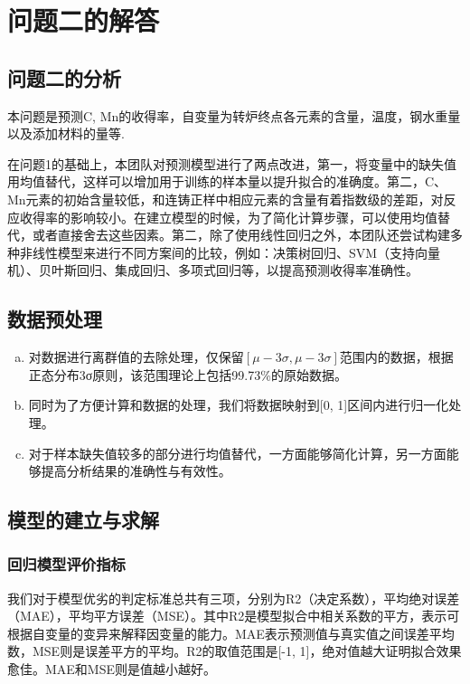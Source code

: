 \documentclass{xcumcmart}
\begin{document}
\section{问题二的解答}
\subsection{问题二的分析}
\par 本问题是预测C, Mn的收得率，自变量为转炉终点各元素的含量，温度，钢水重量以及添加材料的量等.
\par 在问题1的基础上，本团队对预测模型进行了两点改进，第一，将变量中的缺失值用均值替代，这样可以增加用于训练的样本量以提升拟合的准确度。第二，C、Mn元素的初始含量较低，和连铸正样中相应元素的含量有着指数级的差距，对反应收得率的影响较小。在建立模型的时候，为了简化计算步骤，可以使用均值替代，或者直接舍去这些因素。第二，除了使用线性回归之外，本团队还尝试构建多种非线性模型来进行不同方案间的比较，例如：决策树回归、SVM（支持向量机）、贝叶斯回归、集成回归、多项式回归等，以提高预测收得率准确性。



\subsection{数据预处理}
\begin{enumerate}[(a)]
\setlength{\itemindent}{2em}    %
\item 对数据进行离群值的去除处理，仅保留$[\mu-3\sigma,\mu-3\sigma]$范围内的数据，根据正态分布3σ原则，该范围理论上包括99.73\%的原始数据。
\item 同时为了方便计算和数据的处理，我们将数据映射到[0, 1]区间内进行归一化处理。
\item 对于样本缺失值较多的部分进行均值替代，一方面能够简化计算，另一方面能够提高分析结果的准确性与有效性。
\end{enumerate}

\subsection{模型的建立与求解}
\subsubsection{回归模型评价指标}
\par 我们对于模型优劣的判定标准总共有三项，分别为R2（决定系数），平均绝对误差（MAE），平均平方误差（MSE）。其中R2是模型拟合中相关系数的平方，表示可根据自变量的变异来解释因变量的能力。MAE表示预测值与真实值之间误差平均数，MSE则是误差平方的平均。R2的取值范围是[-1, 1]，绝对值越大证明拟合效果愈佳。MAE和MSE则是值越小越好。
\end{document}
